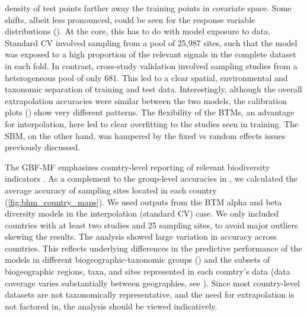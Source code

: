 density of test points farther away the training points in covariate space. Some shifts, albeit less pronounced, could be seen for the response variable distributions (). At the core, this has to do with model exposure to data. Standard CV involved sampling from a pool of 25,987 sites, such that the model was exposed to a high proportion of the relevant signals in the complete dataset in each fold. In contrast, cross-study validation involved sampling studies from a heterogeneous pool of only 681. This led to a clear spatial, environmental and taxonomic separation of training and test data. Interestingly, although the overall extrapolation accuracies were similar between the two models, the calibration plots () show very different patterns. The flexibility of the BTMs, an advantage for interpolation, here led to clear overfitting to the studies seen in training. The SBM, on the other hand, was hampered by the fixed vs random effects issues previously discussed.

The GBF-MF emphasizes country-level reporting of relevant biodiversity indicators \cite{gbfmf2025,affinito2024}. As a complement to the group-level accuracies in , we calculated the average accuracy of sampling sites located in each country (\autoref{fig:bhm_country_maps}). We used outputs from the BTM alpha and beta diversity models in the interpolation (standard CV) case. We only included countries with at least two studies and 25 sampling sites, to avoid major outliers skewing the results. The analysis showed large variation in accuracy across countries. This reflects underlying differences in the predictive performance of the models in different biogeographic-taxonomic groups () and the subsets of biogeographic regions, taxa, and sites represented in each country's data (data coverage varies substantially between geographies, see ). Since most country-level datasets are not taxonomically representative, and the need for extrapolation is not factored in, the analysis should be viewed indicatively.

